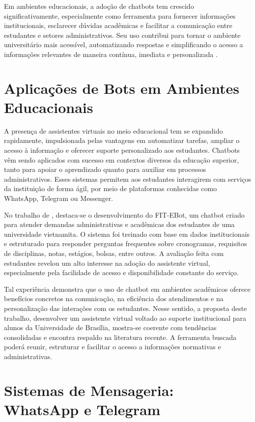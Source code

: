 Em ambientes educacionais, a adoção de chatbots tem crescido significativamente, especialmente como ferramenta para fornecer informações institucionais, esclarecer dúvidas acadêmicas e facilitar a comunicação entre estudantes e setores administrativos. Seu uso contribui para tornar o ambiente universitário mais acessível, automatizando respostas e simplificando o acesso a informações relevantes de maneira contínua, imediata e personalizada \cite{dykeland2018unleashing}.

\section{Aplicações de Bots em Ambientes Educacionais}

A presença de assistentes virtuais no meio educacional tem se expandido rapidamente, impulsionada pelas vantagens em automatizar tarefas, ampliar o acesso à informação e oferecer suporte personalizado aos estudantes. Chatbots vêm sendo aplicados com sucesso em contextos diversos da educação superior, tanto para apoiar o aprendizado quanto para auxiliar em processos administrativos. Esses sistemas permitem aos estudantes interagirem com serviços da instituição de forma ágil, por meio de plataformas conhecidas como WhatsApp, Telegram ou Messenger.

No trabalho de \textcite{hien2018fitebot}, destaca-se o desenvolvimento do FIT-EBot, um chatbot criado para atender demandas administrativas e acadêmicas dos estudantes de uma universidade vietnamita. O sistema foi treinado com base em dados institucionais e estruturado para responder perguntas frequentes sobre cronogramas, requisitos de disciplinas, notas, estágios, bolsas, entre outros. A avaliação feita com estudantes revelou um alto interesse na adoção do assistente virtual, especialmente pela facilidade de acesso e disponibilidade constante do serviço.

Tal experiência demonstra que o uso de chatbot em ambientes acadêmicos oferece benefícios concretos na comunicação, na eficiência dos atendimentos e na personalização das interações com os estudantes. Nesse sentido, a proposta deste trabalho, desenvolver um assistente virtual voltado ao suporte institucional para alunos da Universidade de Brasília, mostra-se coerente com tendências consolidadas e encontra respaldo na literatura recente. A ferramenta buscada poderá reunir, estruturar e facilitar o acesso a informações normativas e administrativas.

\section{Sistemas de Mensageria: WhatsApp e Telegram}

